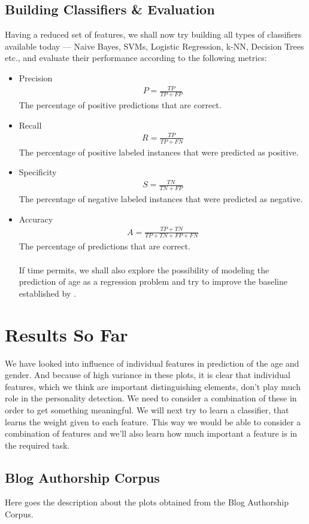 \documentclass{sig-alternate}
\begin{document}
\subsection{Building Classifiers \& Evaluation}
Having a reduced set of features, we shall now try building all types of classifiers available today --- Naive Bayes, SVMs, Logistic Regression, k-NN, Decision Trees etc., and evaluate their performance according to the following metrics:
\begin{itemize}
\item Precision
\begin{align}
P = \frac{TP}{TP+FP}
\end{align}
The percentage of positive predictions that are correct.
\item Recall
\begin{align}
R =  \frac{TP}{TP+FN}
\end{align}
The percentage of positive labeled instances that were predicted as positive.
\item Specificity
\begin{align}
S = \frac{TN}{TN+FP}
\end{align}
The percentage of negative labeled instances that were predicted as negative.
\item Accuracy
\begin{align}
A = \frac{TP+TN}{TP + TN + FP + FN}
\end{align}	The percentage of predictions that are correct.\\\\
If time permits, we shall also explore the possibility of modeling the prediction of age as a regression problem and try to improve the baseline established by \cite{cmu}. 
\end{itemize}
\section{Results So Far}
We have looked into influence of individual features in prediction of the age and gender. And because of high variance in these plots, it is clear that individual features, which we think are important distinguishing elements, don't play much role in the personality detection. We need to consider a combination of these in order to get something meaningful. We will next try to learn a classifier, that learns the weight given to each feature. This way we would be able to consider a combination of features and we'll also learn how much important a feature is in the required task.
\subsection{Blog Authorship Corpus}
Here goes the description about the plots obtained from the Blog Authorship Corpus.
\end{document}
